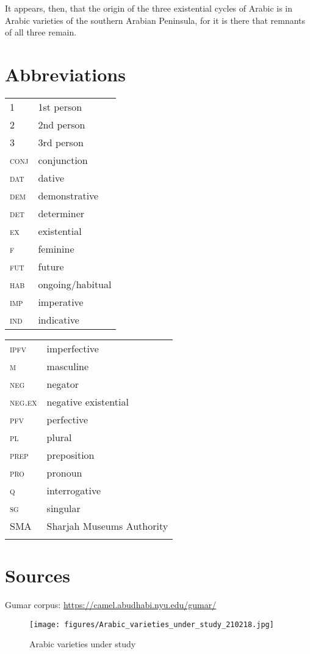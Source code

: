 \documentclass[output=paper,colorlinks,citecolor=brown]{langscibook}
\begin{document}
It appears, then, that the origin of the three existential cycles of Arabic is in Arabic varieties of the southern Arabian Peninsula, for it is there that remnants of all three remain.

\section*{Abbreviations}
\begin{tabularx}{.45\textwidth}{lQ}
    1 & 1st person \\
    2 & 2nd person \\
    3 & 3rd person \\
    \textsc{conj} & conjunction \\
    \textsc{dat} & dative \\
    \textsc{dem}& demonstrative \\
    \textsc{det} & determiner \\
    \textsc{ex} & existential\\
    \textsc{f} & feminine \\
    \textsc{fut} & future \\
    \textsc{hab} & ongoing/habitual \\
    \textsc{imp} & imperative \\
    \textsc{ind} & indicative \\
\end{tabularx}
\begin{tabularx}{.45\textwidth}{lQ}
    \textsc{ipfv} & imperfective \\
    \textsc{m} & masculine \\
    \textsc{neg} & negator \\
    \textsc{neg.ex} & negative existential \\
    \textsc{pfv} & perfective \\
    \textsc{pl} & plural \\
    \textsc{prep} & preposition \\
    \textsc{pro} & pronoun \\
    \textsc{q} & interrogative \\
    \textsc{sg} & singular \\
    SMA & Sharjah Museums Authority \\
    \\
\end{tabularx}

\section*{Sources}

Gumar corpus: \url{https://camel.abudhabi.nyu.edu/gumar/}



{\sloppy\printbibliography[heading=subbibliography,notkeyword=this]}
\begin{sidewaysfigure}
    \texttt{[image: figures/Arabic\_varieties\_under\_study\_210218.jpg]}
    \caption{Arabic varieties under study}
    \label{fig:ArabicVarieties}
\end{sidewaysfigure}
\end{document}
